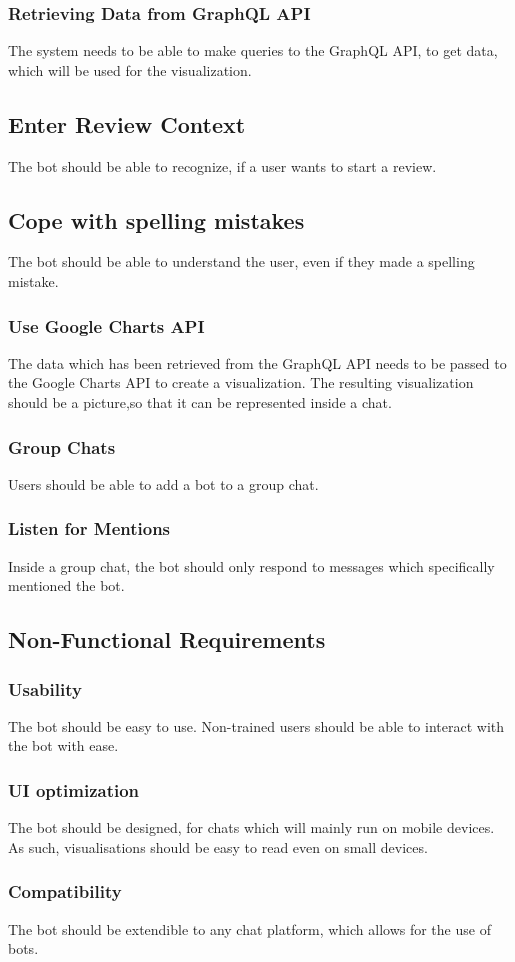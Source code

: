 \subsubsection{Retrieving Data from GraphQL API}
The system needs to be able to make queries to the GraphQL API, to get data, which will be used for the visualization.

\subsection{Enter Review Context} The bot should be able to recognize, if a user wants to start a review.

\subsection{Cope with spelling mistakes} The bot should be able to understand the user, even if they made a spelling mistake.

\subsubsection{Use Google Charts API} The data which has been retrieved from the GraphQL API needs to be passed to the Google Charts API to create a visualization. The resulting visualization should be a picture,so that it can be represented inside a chat.

\subsubsection{Group Chats} Users should be able to add a bot to a group chat.

\subsubsection{Listen for Mentions} Inside a group chat, the bot should only respond to messages which specifically mentioned the bot.

\subsection{Non-Functional Requirements}

\subsubsection{Usability} The bot should be easy to use. Non-trained users should be able to interact with the bot with ease.

\subsubsection{UI optimization} The bot should be designed, for chats which will mainly run on mobile devices. As such, visualisations should be easy to read even on small devices.

\subsubsection{Compatibility} The bot should be extendible to any chat platform, which allows for the use of bots.

